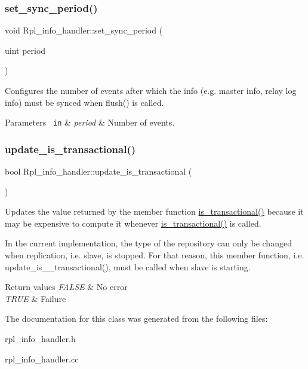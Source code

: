 \subsubsection{\texorpdfstring{set\+\_\+sync\+\_\+period()}{set\_sync\_period()}}
{\footnotesize\ttfamily void Rpl\+\_\+info\+\_\+handler\+::set\+\_\+sync\+\_\+period (\begin{DoxyParamCaption}\item[{uint}]{period }\end{DoxyParamCaption})}

Configures the number of events after which the info (e.\+g. master info, relay log info) must be synced when flush() is called.


\begin{DoxyParams}[1]{Parameters}
\mbox{\texttt{ in}}  & {\em period} & Number of events. \\
\hline
\end{DoxyParams}
\mbox{\label{classRpl__info__handler_a92f9a87194f6b1400e67329515827504}} 
\subsubsection{\texorpdfstring{update\+\_\+is\+\_\+transactional()}{update\_is\_transactional()}}
{\footnotesize\ttfamily bool Rpl\+\_\+info\+\_\+handler\+::update\+\_\+is\+\_\+transactional (\begin{DoxyParamCaption}{ }\end{DoxyParamCaption})\hspace{0.3cm}{\ttfamily [inline]}}

Updates the value returned by the member function \mbox{\hyperlink{classRpl__info__handler_ae8a2d0ebeccf92a6c5c953a8ec16ab94}{is\+\_\+transactional()}} because it may be expensive to compute it whenever \mbox{\hyperlink{classRpl__info__handler_ae8a2d0ebeccf92a6c5c953a8ec16ab94}{is\+\_\+transactional()}} is called.

In the current implementation, the type of the repository can only be changed when replication, i.\+e. slave, is stopped. For that reason, this member function, i.\+e. update\+\_\+is\+\_\+\+\_\+transactional(), must be called when slave is starting.


\begin{DoxyRetVals}{Return values}
{\em F\+A\+L\+SE} & No error \\
\hline
{\em T\+R\+UE} & Failure \\
\hline
\end{DoxyRetVals}


The documentation for this class was generated from the following files\+:\begin{DoxyCompactItemize}
\item 
rpl\+\_\+info\+\_\+handler.\+h\item 
rpl\+\_\+info\+\_\+handler.\+cc\end{DoxyCompactItemize}
